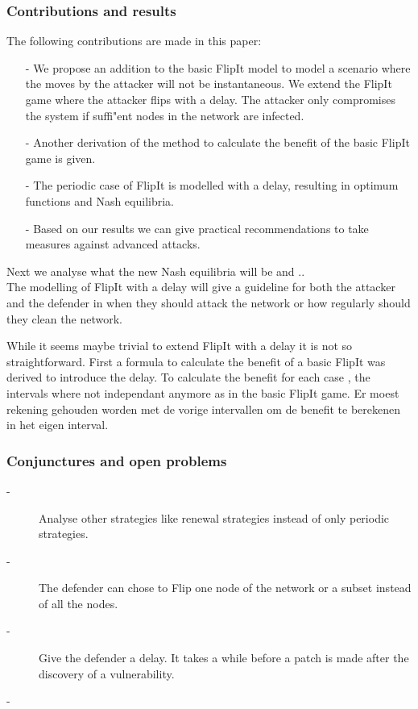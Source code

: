 \subsubsection{Contributions and results}
The following contributions are made in this paper:
\begin{itemize}
\item[-] We propose an addition to the basic FlipIt model to model a scenario where the moves by the attacker will not be instantaneous. We extend the FlipIt game where the attacker flips with a delay. The attacker only compromises the system if suffi"ent nodes in the network are infected. 
\item[-] Another derivation of the method to calculate the benefit of the basic FlipIt game is given.
\item[-] The periodic case of FlipIt is modelled with a delay, resulting in optimum functions and Nash equilibria. 
\item[-] Based on our results we can give practical recommendations to take measures against advanced attacks. 
\end{itemize}
 Next we analyse what the new Nash equilibria will be and .. \\
 The modelling of FlipIt with a delay will give a guideline for both the attacker and the defender in when they should attack the network or how regularly should they clean the network.

While it seems maybe trivial to extend FlipIt with a delay it is not so straightforward. First a formula to calculate the benefit of a basic FlipIt was derived to introduce the delay. To calculate the benefit for each case , the intervals where not independant anymore as in the basic FlipIt game. Er moest rekening gehouden worden met de vorige intervallen om de benefit te berekenen in het eigen interval. 

\subsubsection{Conjunctures and open problems}

\begin{description}
\item[-] Analyse other strategies like renewal strategies instead of only periodic strategies.
\item[-] The defender can chose to Flip one node of the network or a subset instead of all the nodes.
\item[-] Give the defender a delay. It takes a while before a patch is made after the discovery of a vulnerability.
\item[-]
\end{description}

